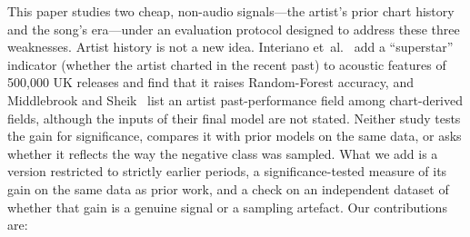 \documentclass[conference]{IEEEtran}
\begin{document}
This paper studies two cheap, non-audio signals---the artist's prior chart history and
the song's era---under an evaluation protocol designed to address these three weaknesses.
Artist history is not a new idea. Interiano et~al.~\cite{interiano2018musical} add a
``superstar'' indicator (whether the artist charted in the recent past) to acoustic
features of 500{,}000 UK releases and find that it raises Random-Forest accuracy, and
Middlebrook and Sheik~\cite{middlebrook2019song} list an artist past-performance field
among chart-derived fields, although the inputs of their final model are not stated.
Neither study tests the gain for significance, compares it with prior models on the same
data, or asks whether it reflects the way the negative class was sampled. What we add is a version restricted to strictly earlier periods, a
significance-tested measure of its gain on the same data as prior work, and a check on an
independent dataset of whether that gain is a genuine signal or a sampling artefact.
Our contributions are:
\end{document}
